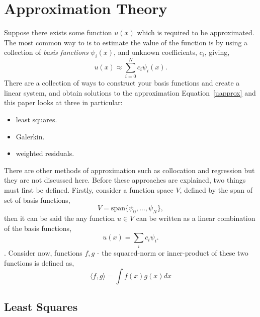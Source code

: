 \section{Approximation Theory}

Suppose there exists some function $u(x)$ which is required to be approximated. The most common way to is to estimate the value of the function is by using a collection of \textit{basis functions} $\psi_i(x)$, and unknown coefficients, $c_i$, giving,
\begin{equation}\label{uapprox}
	u(x) \approx \sum_{i=0}^N c_i\psi_i(x).
\end{equation}
There are a collection of ways to construct your basis functions and create a linear system, and obtain solutions to the approximation Equation~\eqref{uapprox} and this paper looks at three in particular:
\begin{itemize}
	\item least squares.
	\item Galerkin.
	\item weighted residuals.
\end{itemize}
There are other methods of approximation such as collocation and regression but they are not discussed here. Before these approaches are explained, two things must first be defined. Firstly, consider a function space $V$, defined by the span of set of basis functions,
\begin{equation}
	V = \text{span}\{\psi_0,\dots,\psi_N\},
\end{equation}
then it can be said the any function $u\in V$ can be written as a linear combination of the basis functions,
	\begin{equation}\label{basis}
		u(x) = \sum_i c_i \psi_i. 
	\end{equation}
\cite{mardal}. Consider now, functions $f,g$ - the squared-norm or inner-product of these two functions is defined as,
\begin{equation}\label{innerprod}
	\langle f,g\rangle = \int f(x)g(x)dx
\end{equation}

\subsection{Least Squares}

